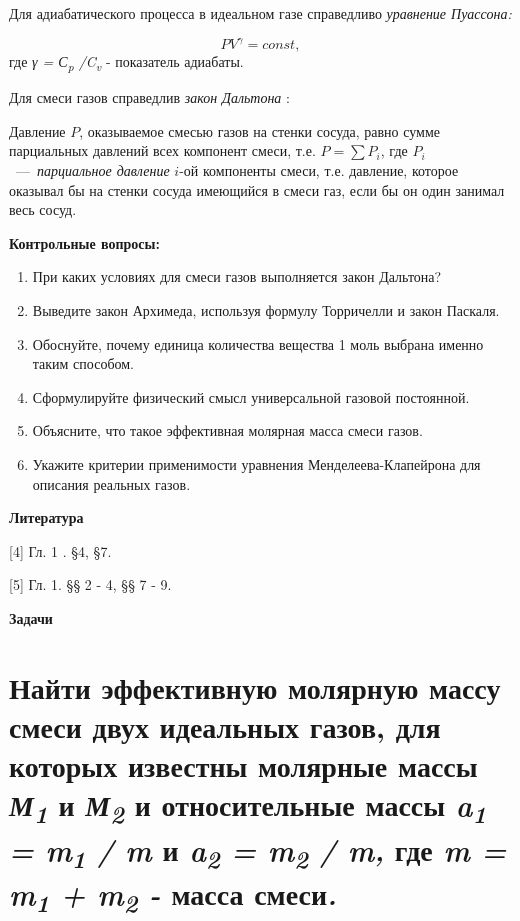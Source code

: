 Для адиабатического процесса в идеальном газе справедливо \emph{уравнение Пуассона:}

$$PV^\gamma = const,$$
где \emph{γ = С\textsubscript{p}
/C\textsubscript{v}} - показатель адиабаты.

Для смеси газов справедлив \emph{закон Дальтона} :

Давление $P$, оказываемое смесью газов на стенки сосуда, равно сумме парциальных давлений всех компонент смеси, т.е. $P=\sum P_i$, где $P_i$~---~\emph{парциальное давление}
$i$-ой компоненты смеси, т.е. давление, которое оказывал бы на
стенки сосуда имеющийся в смеси газ, если бы он один занимал весь сосуд.
\begin{center}
  \textbf{Контрольные вопросы:}
\end{center}

\begin{enumerate}
\def\labelenumi{\arabic{enumi}.}
\item При каких условиях для смеси газов выполняется закон Дальтона?
\item Выведите закон Архимеда, используя формулу Торричелли и закон Паскаля.
\item Обоснуйте, почему единица количества вещества 1 моль выбрана именно
  таким способом.
\item Сформулируйте физический смысл универсальной газовой постоянной.
\item Объясните, что такое эффективная молярная масса смеси газов.
\item Укажите критерии применимости уравнения Менделеева-Клапейрона для
  описания реальных газов.
\end{enumerate}

\begin{center}
  \textbf{Литература}
\end{center}

{[}4{]} Гл. 1 . §4, §7.

{[}5{]} Гл. 1. §§ 2 - 4, §§ 7 - 9.

\begin{center}
  \textbf{Задачи}
\end{center}

\section{Найти эффективную молярную массу смеси двух идеальных
газов, для которых известны молярные массы \emph{М\textsubscript{1}} и
\emph{М\textsubscript{2}} и относительные массы \emph{a\textsubscript{1}
= m\textsubscript{1} / m} и \emph{a\textsubscript{2} =
m\textsubscript{2} / m,} где \emph{m = m\textsubscript{1} +
m\textsubscript{2} -} масса смеси\emph{.}}

